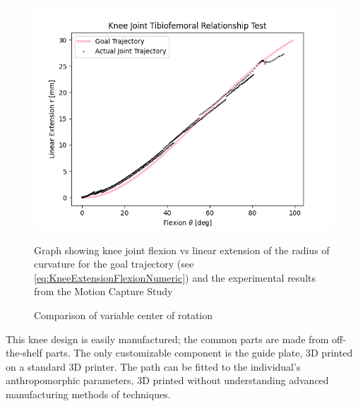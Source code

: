 \begin{figure}[ht!]
    \centering
    \includegraphics[scale=0.75]{images/mech_design/FlexionExtensionKneeJoint.png}
    \caption{Comparison of variable center of rotation}{Graph showing knee joint flexion vs linear extension of the radius of curvature for the goal trajectory (see \autoref{eq:KneeExtensionFlexionNumeric}) and the experimental results from the Motion Capture Study}
    \label{fig:KneeJointTestResults}
\end{figure}

This knee design is easily manufactured; the common parts are made from off-the-shelf parts. The only customizable component is the guide plate, 3D printed on a standard 3D printer. The path can be fitted to the individual's anthropomorphic parameters, 3D printed without understanding advanced manufacturing methods of techniques. 
